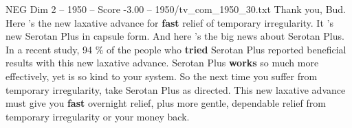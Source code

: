 \begin{textsample}{NEG Dim 2 – 1950 – Score -3.00 – 1950/tv\_com\_1950\_30.txt}  \label{ex:f2_neg_085}
Thank you, Bud.
Here 's the new laxative advance for \textbf{fast} relief of temporary irregularity.
It 's new Serotan Plus in capsule form.
And here 's the big news about Serotan Plus.
In a recent study, 94 \% of the people who \textbf{tried} Serotan Plus reported beneficial results with this new laxative advance.
Serotan Plus \textbf{works} so much more effectively, yet is so kind to your system.
So the next time you suffer from temporary irregularity, take Serotan Plus as directed.
This new laxative advance must give you \textbf{fast} overnight relief, plus more gentle, dependable relief from temporary irregularity or your money back.

\end{textsample}
